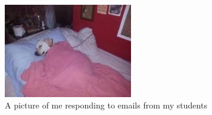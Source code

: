 

\begin{figure}[htbp]
  \centering
  \includegraphics[width=0.5\textwidth]{fig/img/me.jpg}
  \caption{A picture of me responding to emails from my students}
  \label{fig:me}
\end{figure}
